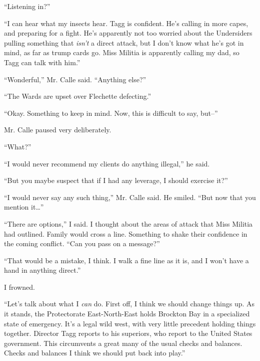 ``Listening in?''



``I can hear what my insects hear.  Tagg is confident.  He's calling in more capes, and preparing for a fight.  He's apparently not too worried about the Undersiders pulling something that \emph{isn't} a direct attack, but I don't know what he's got in mind, as far as trump cards go.  Miss Militia is apparently calling my dad, so Tagg can talk with him.''



``Wonderful,'' Mr. Calle said.  ``Anything else?''



``The Wards are upset over Flechette defecting.''



``Okay.  Something to keep in mind.  Now, this is difficult to say, but--''



Mr. Calle paused very deliberately.



``What?''



``I would never recommend my clients do anything illegal,'' he said.



``But you maybe suspect that if I had any leverage, I should exercise it?''



``I would never say any such thing,'' Mr. Calle said.  He smiled.  ``But now that you mention it\ldots''



``There are options,'' I said.  I thought about the areas of attack that Miss Militia had outlined.  Family would cross a line.  Something to shake their confidence in the coming conflict.  ``Can you pass on a message?''



``That would be a mistake, I think.  I walk a fine line as it is, and I won't have a hand in anything direct.''



I frowned.



``Let's talk about what I \emph{can} do.  First off, I think we should change things up.  As it stands, the Protectorate East-North-East holds Brockton Bay in a specialized state of emergency.  It's a legal wild west, with very little precedent holding things together.  Director Tagg reports to his superiors, who report to the United States government.  This circumvents a great many of the usual checks and balances.  Checks and balances I think we should put back into play.''



